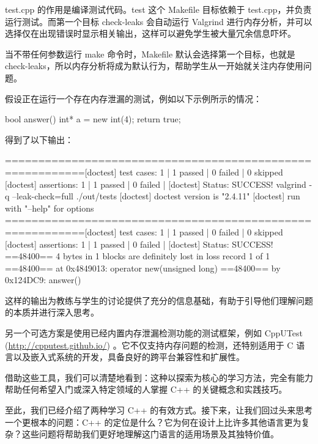 test.cpp 的作用是编译测试代码。test 这个 Makefile 目标依赖于 test.cpp，并负责运行测试。而第一个目标 check-leaks 会自动运行 Valgrind 进行内存分析，并可以选择仅在出现错误时显示相关输出，这样可以避免学生被大量冗余信息吓坏。

当不带任何参数运行 make 命令时，Makefile 默认会选择第一个目标，也就是 check-leaks，所以内存分析将成为默认行为，帮助学生从一开始就关注内存使用问题。

假设正在运行一个存在内存泄漏的测试，例如以下示例所示的情况：

\begin{cpp}
bool answer(){
  int* a = new int(4);
  return true;
}
\end{cpp}

得到了以下输出：

\begin{shell}
==========================================================[doctest]
test cases: 1 | 1 passed | 0 failed | 0 skipped
[doctest] assertions: 1 | 1 passed | 0 failed |
[doctest] Status: SUCCESS!
valgrind -q --leak-check=full ./out/tests
[doctest] doctest version is "2.4.11"
[doctest] run with "--help" for options
==========================================================[doctest]
test cases: 1 | 1 passed | 0 failed | 0 skipped
[doctest] assertions: 1 | 1 passed | 0 failed |
[doctest] Status: SUCCESS!
==48400== 4 bytes in 1 blocks are definitely lost in loss record 1 of 1
==48400== at 0x4849013: operator new(unsigned long) ==48400== by 0x124DC9: answer()
\end{shell}

这样的输出为教练与学生的讨论提供了充分的信息基础，有助于引导他们理解问题的本质并进行深入思考。

另一个可选方案是使用已经内置内存泄漏检测功能的测试框架，例如 CppUTest (\url{http://cpputest.github.io/}) 。它不仅支持内存问题的检测，还特别适用于 C 语言以及嵌入式系统的开发，具备良好的跨平台兼容性和扩展性。

借助这些工具，我们可以清楚地看到：这种以探索为核心的学习方法，完全有能力帮助任何希望入门或深入特定领域的人掌握 C++ 的关键概念和实践技巧。

至此，我们已经介绍了两种学习 C++ 的有效方式。接下来，让我们回过头来思考一个更根本的问题：C++ 的定位是什么？它为何在设计上比许多其他语言更为复杂？这些问题将帮助我们更好地理解这门语言的适用场景及其独特价值。














